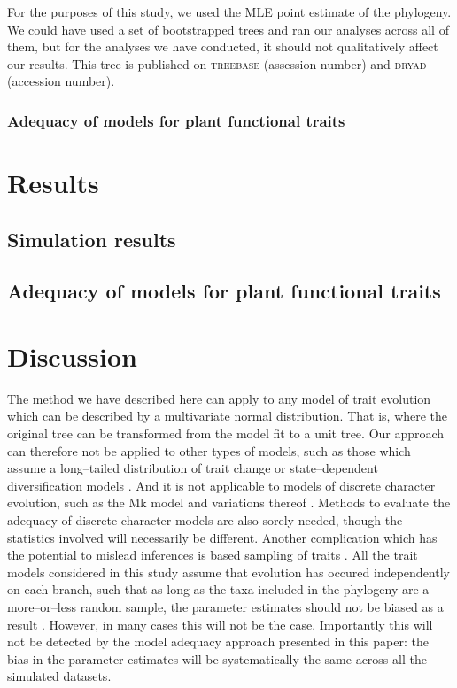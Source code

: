 \documentclass[12pt]{article}
\begin{document}
For the purposes of this study, we used the MLE point estimate of the phylogeny. We could have used a set of bootstrapped trees and ran our analyses across all of them, but for the analyses we have conducted, it should not qualitatively affect our results. This tree is published on \textsc{treebase} (assession number) and \textsc{dryad} (accession number).

\subsubsection{Adequacy of models for plant functional traits}


\section{Results}

\subsection{Simulation results}

\subsection{Adequacy of models for plant functional traits}


\section{Discussion}

The method we have described here can apply to any model of trait evolution which can be described by a multivariate normal distribution. That is, where the original tree can be transformed from the model fit to a unit tree. Our approach can therefore not be applied to other types of models, such as those which assume a long--tailed distribution of trait change \citep[e.g.][]{Landis2012} or state--dependent diversification models \citep[e.g.][]{Bokma2008, Bokma2010, FitzJohn2010}. And it is not applicable to models of discrete character evolution, such as the Mk model \citep{Pagel1994, Lewis2001} and variations thereof \citep[e.g.][]{Maddison2007, WagnerMarcot2010, Mazeralli2012, Beaulieu2013} \citep[but see Felsenstein's threshold model;][]{Felsenstein2005, Felsenstein2012}. Methods to evaluate the adequacy of discrete character models are also sorely needed, though the statistics involved will necessarily be different.
Another complication which has the potential to mislead inferences is based sampling of traits \citep{Freckletoninaction, longeuroname, FitzJohnwoody}. All the trait models considered in this study assume that evolution has occured independently on each branch, such that as long as the taxa included in the phylogeny are a more--or--less random sample, the parameter estimates should not be biased as a result \citep{PennellHarmon}. However, in many cases \citep[especially when using large trait databases][]{FitzJohnwoody} this will not be the case. Importantly this will not be detected by the model adequacy approach presented in this paper: the bias in the parameter estimates will be systematically the same across all the simulated datasets.
\end{document}
